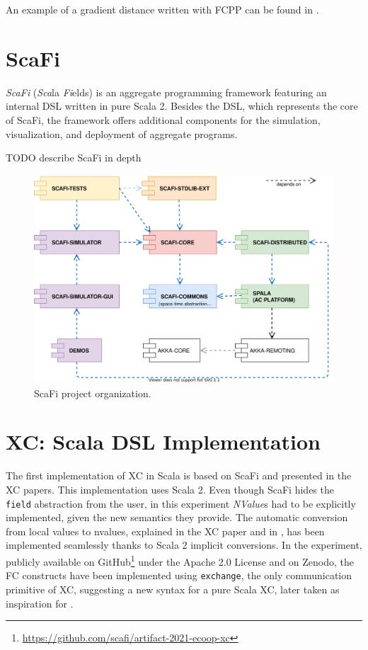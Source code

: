 An example of a gradient distance written with FCPP can be found in .



\section{ScaFi} \label{chap:state-of-the-art->sec:scafi}

\textit{ScaFi} (\textit{Sca}la \textit{Fi}elds) is an aggregate programming framework featuring an internal \ac{DSL} written in pure Scala 2\cite{scafi}.
%
Besides the \ac{DSL}, which represents the core of ScaFi, the framework offers additional components for the simulation, visualization, and deployment of aggregate programs.

TODO describe ScaFi in depth

\begin{figure}
    \centering
    \includegraphics[width=.8\linewidth]{figures/scafi-project-org.drawio.png}
    \caption{ScaFi project organization.}
    \label{fig:random-image2}
\end{figure}

\section{XC: Scala DSL Implementation} \label{chap:state-of-the-art->sec:xc}

The first implementation of \ac{XC} in Scala is based on ScaFi and presented in the \ac{XC} papers\cite{xc}\cite{xc-experiment-with-scafi}.
%
This implementation uses Scala 2.
%
Even though ScaFi hides the \texttt{field} abstraction from the user, in this experiment \textit{NValue}s had to be explicitly implemented, given the new semantics they provide.
%
The automatic conversion from local values to nvalues, explained in the \ac{XC} paper and in , has been implemented seamlessly thanks to Scala 2 implicit conversions.
%
In the experiment, publicly available on GitHub\footnote{\url{https://github.com/scafi/artifact-2021-ecoop-xc}} under the Apache 2.0 License and on Zenodo\cite{xc-experiment-with-scafi-code}, the \ac{FC} constructs have been implemented using \texttt{exchange}, the only communication primitive of \ac{XC}, suggesting a new syntax for a pure Scala \ac{XC}, later taken as inspiration for \this.

